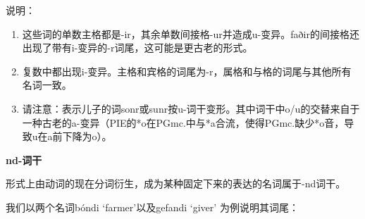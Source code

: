 说明：

\begin{enumerate}
  \def\labelenumi{\arabic{enumi})}
  \item
        这些词的单数主格都是-ir，其余单数间接格-ur并造成u-变异。faðir的间接格还出现了带有i-变异的-r词尾，这可能是更古老的形式。
  \item
        复数中都出现i-变异。主格和宾格的词尾为-r，属格和与格的词尾与其他所有名词一致。
  \item
        请注意：表示儿子的词sonr或sunr按u-词干变形。其中词干中o/u的交替来自于一种古老的a-变异（PIE的*o在PGmc.中与*a合流，使得PGmc.缺少*o音，导致u在a前下降为o）。
\end{enumerate}

\textbf{nd-词干}

形式上由动词的现在分词衍生，成为某种固定下来的表达的名词属于-nd词干。

我们以两个名词bóndi `farmer'以及gefandi `giver' 为例说明其词尾：

